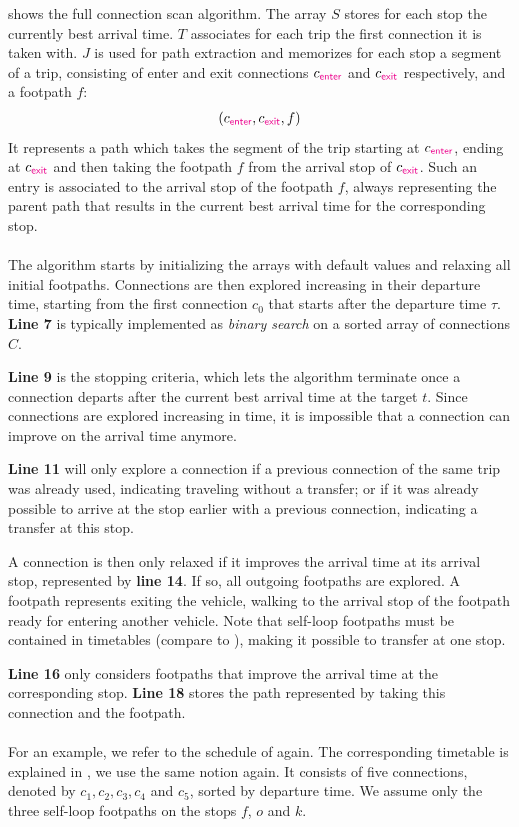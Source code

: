 	 shows the full connection scan algorithm. The array $S$ stores for each stop the currently best arrival time.
	$T$ associates for each trip the first connection it is taken with. $J$ is used for path extraction and memorizes for each stop a
	segment of a trip, consisting of enter and exit connections $c_{\textcolor{magenta}{\textsf{enter}}}$ and $c_{\textcolor{magenta}{\textsf{exit}}}$ respectively, and a footpath $f$:
	\begin{align*}
		(c_{\textcolor{magenta}{\textsf{enter}}}, c_{\textcolor{magenta}{\textsf{exit}}}, f)
	\end{align*}
	It represents a path which takes the segment of the trip starting at $c_{\textcolor{magenta}{\textsf{enter}}}$, ending at $c_{\textcolor{magenta}{\textsf{exit}}}$ and then taking the footpath $f$ from
	the arrival stop of $c_{\textcolor{magenta}{\textsf{exit}}}$. Such an entry is associated to the arrival stop of the footpath $f$, always representing the parent path
	that results in the current best arrival time for the corresponding stop.\\\\
	The algorithm starts by initializing the arrays with default values and relaxing all initial footpaths. Connections are then explored
	increasing in their departure time, starting from the first connection $c_0$ that starts after the departure time $\tau$. \textbf{Line 7}
	is typically implemented as \textit{binary search}  on a sorted array of connections $C$.
	
	\textbf{Line 9} is the stopping criteria, which lets the algorithm terminate once a connection departs after the current best arrival
	time at the target $t$. Since connections are explored increasing in time, it is impossible that a connection can improve on the
	arrival time anymore.
	
	\textbf{Line 11} will only explore a connection if a previous connection of the same trip was already used, indicating
	traveling without a transfer; or if it was already possible to arrive at the stop earlier with a previous connection, indicating
	a transfer at this stop.
	
	A connection is then only relaxed if it improves the arrival time at its arrival stop, represented by \textbf{line 14}.
	If so, all outgoing footpaths are explored. A footpath represents exiting the vehicle, walking to the arrival stop of the footpath
	ready for entering another vehicle. Note that self-loop footpaths must be contained in timetables (compare to ),
	making it possible to transfer at one stop.
	
	\textbf{Line 16} only considers footpaths that improve the arrival time at the corresponding stop. \textbf{Line 18} stores the path
	represented by taking this connection and the footpath.\\\\
	For an example, we refer to the schedule of  again. The corresponding timetable is
	explained in , we use the same notion again.
	It consists of five connections, denoted by $c_1, c_2, c_3, c_4$ and $c_5$,
	sorted by departure time. We assume only the three self-loop footpaths on the stops $f$, $o$ and $k$.
	
